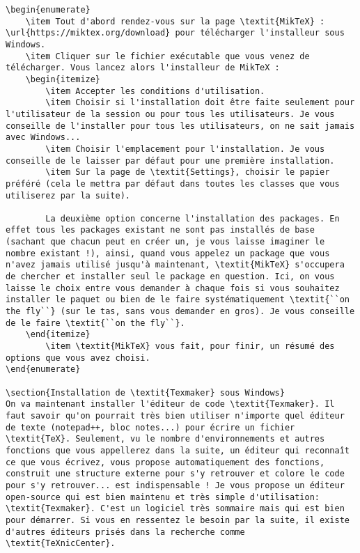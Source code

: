 \documentclass[11pt,a4paper]{article} %
\begin{document}
\begin{Verbatim}[breaklines=true]
\begin{enumerate}
	\item Tout d'abord rendez-vous sur la page \textit{MikTeX} : \url{https://miktex.org/download} pour télécharger l'installeur sous Windows.
	\item Cliquer sur le fichier exécutable que vous venez de télécharger. Vous lancez alors l'installeur de MikTeX :
	\begin{itemize}
		\item Accepter les conditions d'utilisation.
		\item Choisir si l'installation doit être faite seulement pour l'utilisateur de la session ou pour tous les utilisateurs. Je vous conseille de l'installer pour tous les utilisateurs, on ne sait jamais avec Windows...
		\item Choisir l'emplacement pour l'installation. Je vous conseille de le laisser par défaut pour une première installation.
		\item Sur la page de \textit{Settings}, choisir le papier préféré (cela le mettra par défaut dans toutes les classes que vous utiliserez par la suite).
		
		La deuxième option concerne l'installation des packages. En effet tous les packages existant ne sont pas installés de base (sachant que chacun peut en créer un, je vous laisse imaginer le nombre existant !), ainsi, quand vous appelez un package que vous n'avez jamais utilisé jusqu'à maintenant, \textit{MikTeX} s'occupera de chercher et installer seul le package en question. Ici, on vous laisse le choix entre vous demander à chaque fois si vous souhaitez installer le paquet ou bien de le faire systématiquement \textit{``on the fly``} (sur le tas, sans vous demander en gros). Je vous conseille de le faire \textit{``on the fly``}.
	\end{itemize}
		\item \textit{MikTeX} vous fait, pour finir, un résumé des options que vous avez choisi.
\end{enumerate}

\section{Installation de \textit{Texmaker} sous Windows}
On va maintenant installer l'éditeur de code \textit{Texmaker}. Il faut savoir qu'on pourrait très bien utiliser n'importe quel éditeur de texte (notepad++, bloc notes...) pour écrire un fichier \textit{TeX}. Seulement, vu le nombre d'environnements et autres fonctions que vous appellerez dans la suite, un éditeur qui reconnaît ce que vous écrivez, vous propose automatiquement des fonctions, construit une structure externe pour s'y retrouver et colore le code pour s'y retrouver... est indispensable ! Je vous propose un éditeur open-source qui est bien maintenu et très simple d'utilisation: \textit{Texmaker}. C'est un logiciel très sommaire mais qui est bien pour démarrer. Si vous en ressentez le besoin par la suite, il existe d'autres éditeurs prisés dans la recherche comme \textit{TeXnicCenter}.


\end{Verbatim}
\end{document}
